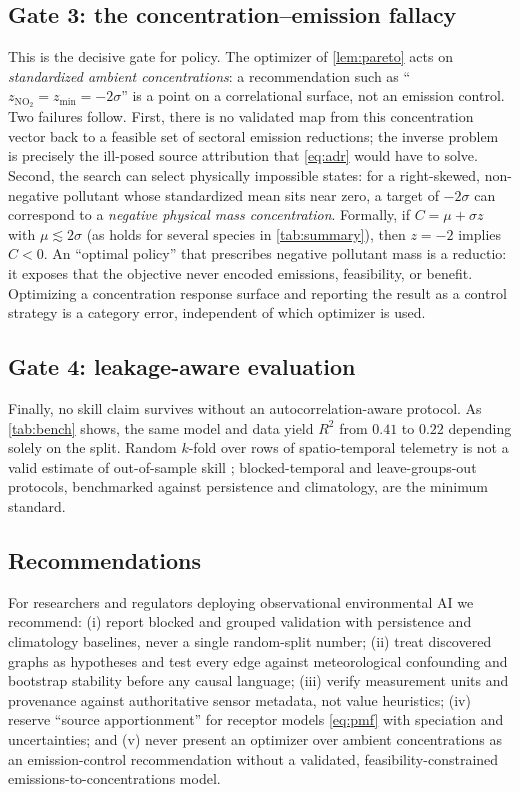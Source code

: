\subsection{Gate 3: the concentration--emission fallacy}
This is the decisive gate for policy. The optimizer of \cref{lem:pareto} acts on
\emph{standardized ambient concentrations}: a recommendation such as
``$z_{\mathrm{NO_2}}=z_{\min}=-2\sigma$'' is a point on a correlational surface, not an
emission control. Two failures follow. First, there is no validated map from this
concentration vector back to a feasible set of sectoral emission reductions; the
inverse problem is precisely the ill-posed source attribution that
\eqref{eq:adr} would have to solve. Second, the search can select physically
impossible states: for a right-skewed, non-negative pollutant whose standardized mean
sits near zero, a target of $-2\sigma$ can correspond to a \emph{negative physical
mass concentration}. Formally, if $C=\mu+\sigma z$ with $\mu\lesssim 2\sigma$ (as holds
for several species in \cref{tab:summary}), then $z=-2$ implies $C<0$. An
``optimal policy'' that prescribes negative pollutant mass is a reductio: it exposes
that the objective never encoded emissions, feasibility, or benefit. Optimizing a
concentration response surface and reporting the result as a control strategy is a
category error, independent of which optimizer is used.

\subsection{Gate 4: leakage-aware evaluation}
Finally, no skill claim survives without an autocorrelation-aware protocol. As
\cref{tab:bench} shows, the same model and data yield $R^2$ from $0.41$ to $0.22$
depending solely on the split. Random $k$-fold over rows of spatio-temporal telemetry
is not a valid estimate of out-of-sample skill \citep{roberts2017cv,kaufman2012leakage};
blocked-temporal and leave-groups-out protocols, benchmarked against persistence and
climatology, are the minimum standard.

\subsection{Recommendations}
For researchers and regulators deploying observational environmental AI we recommend:
(i) report blocked and grouped validation with persistence and climatology baselines,
never a single random-split number; (ii) treat discovered graphs as hypotheses and test
every edge against meteorological confounding and bootstrap stability before any causal
language; (iii) verify measurement units and provenance against authoritative sensor
metadata, not value heuristics; (iv) reserve ``source apportionment'' for receptor
models \eqref{eq:pmf} with speciation and uncertainties; and (v) never present an
optimizer over ambient concentrations as an emission-control recommendation without a
validated, feasibility-constrained emissions-to-concentrations model.
